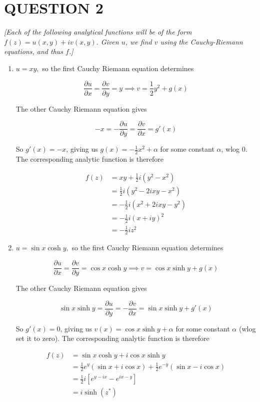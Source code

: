 \documentclass[a4paper]{article}
\begin{document}
\section{QUESTION 2}
\emph{[Each of the following analytical functions will be of the form $ f(z) = u(x,y) + iv(x,y) $. Given $ u $, we find $ v $ using the Cauchy-Riemann equations, and thus $ f $.] }
\begin{enumerate}
	
	\item $ u = xy, $ so the first Cauchy Riemann equation determines
	
	\[ \frac{\partial u }{\partial x} = \frac{\partial v }{\partial y} = y \implies  v = \frac{1}{2} y^{2} + g(x) \]
	
	The other Cauchy Riemann equation gives
	
	\[ -x = - \frac{\partial u }{\partial y} = \frac{\partial v }{\partial x} = g'(x) \]
	
	So $ g'(x) = - x $, giving us $ g(x) = - \frac{1}{2} x^{2} + \alpha $ for some constant $ \alpha $, wlog 0. The corresponding analytic function is therefore
	
	\begin{align*}
	f(z) & = xy +  \frac{1}{2} i (y^{2} - x^{2}) \\
	& = \frac{1}{2} i \left( y^{2} - 2ixy - x^{2}    \right) \\
	& =  - \frac{1}{2} i \left( x^{2} + 2 i x y - y^{2}    \right) \\
	& = - \frac{1}{2} i \left( x + i y   \right)^{2} \\
	& = - \frac{1}{2} i z^{2}
	\end{align*}
	
	
		
	\item $ u = \sin x \cosh y, $ so the first Cauchy Riemann equation determines
	
	\[ \frac{\partial u }{\partial x} = \frac{\partial v }{\partial y} =   \cos x \cosh y\implies v = \cos x \sinh y + g(x) \]
	
	The other Cauchy Riemann equation gives
	
	\[ \sin x \sinh y = \frac{\partial u }{\partial y} = - \frac{\partial v }{\partial x} = \sin x \sinh y + g'(x) \]
	
	So $ g'(x) = 0 $, giving us $ v(x) = \cos x \sinh y + \alpha $ for some constant $ \alpha $ (wlog set it to zero). The corresponding analytic function is therefore
	
	
	\begin{align*}
	f(z) & = \sin x \cosh y  +  i \cos x \sinh y \\
	& = \frac{1}{2} e^{y} (\sin x + i \cos x) + \frac{1}{2} e^{-y} ( \sin x - i \cos x) \\
	& = \frac{1}{2} i [   e^{y - i x} - e^{ix - y} ] \\
	& = i \sinh (z^{*})
	\end{align*}
	

\end{enumerate}
\end{document}
